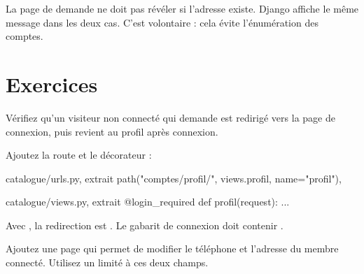 \begin{attention}
La page de demande ne doit pas révéler si l'adresse existe. Django affiche le même
message dans les deux cas. C'est volontaire : cela évite l'énumération des comptes.
\end{attention}

\section{Exercices}

\begin{exercice}
Vérifiez qu'un visiteur non connecté qui demande  est
redirigé vers la page de connexion, puis revient au profil après connexion.
\end{exercice}

\begin{correction}
Ajoutez la route et le décorateur :

\begin{codebox}[python]{catalogue/urls.py, extrait}
path("comptes/profil/", views.profil, name="profil"),
\end{codebox}

\begin{codebox}[python]{catalogue/views.py, extrait}
@login_required
def profil(request):
    ...
\end{codebox}

Avec , la redirection est
. Le gabarit de connexion doit contenir
.
\end{correction}

\begin{exercice}
Ajoutez une page qui permet de modifier le téléphone et l'adresse du membre
connecté. Utilisez un  limité à ces deux champs.
\end{exercice}

